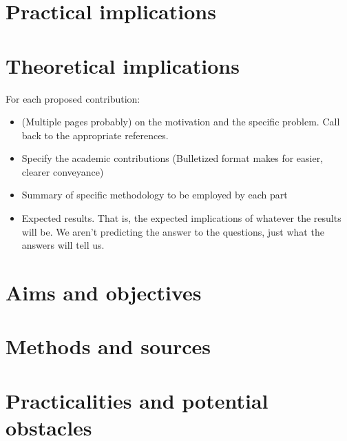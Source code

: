 \section{Practical implications}
\section{Theoretical implications}

For each proposed contribution:

\begin{itemize}
    \item (Multiple pages probably) on the motivation and the specific problem. Call back to the appropriate references.
    \item Specify the academic contributions (Bulletized format makes for easier, clearer conveyance)
    \item Summary of specific methodology to be employed by each part
    \item Expected results. That is, the expected implications of whatever the results will be. We aren't predicting the answer to the questions, just what the answers will tell us.
\end{itemize}

\section{Aims and objectives}
\section{Methods and sources}
\section{Practicalities and potential obstacles}

